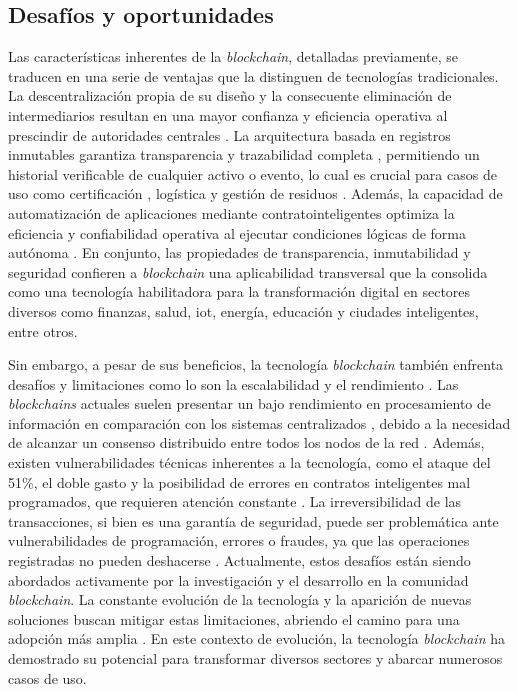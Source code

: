 \subsection{Desafíos y oportunidades}

Las características inherentes de la \textit{blockchain}, detalladas previamente, se traducen en una serie de ventajas que la distinguen de tecnologías tradicionales. La descentralización propia de su diseño y la consecuente eliminación de intermediarios resultan en una mayor confianza \cite{rejeb2023role} y eficiencia operativa al prescindir de autoridades centrales \cite{sharabati2024blockchain}. La arquitectura basada en registros inmutables garantiza transparencia y \gls{trazabilidad} completa \cite{sharabati2024blockchain}, permitiendo un historial verificable de cualquier activo o evento, lo cual es crucial para casos de uso como certificación \cite{bartolomeo2020introduccion}, logística \cite{bartolomeo2020introduccion, rejeb2023role} y gestión de residuos \cite{bulkowska2023implementation}. Además, la capacidad de automatización de aplicaciones mediante \glspl{contratointeligente} optimiza la eficiencia y confiabilidad operativa al ejecutar condiciones lógicas de forma autónoma \cite{bartolomeo2020introduccion}. En conjunto, las propiedades de transparencia, inmutabilidad y seguridad confieren a \textit{blockchain} una aplicabilidad transversal que la consolida como una tecnología habilitadora para la transformación digital en sectores diversos como finanzas, salud, \gls{iot}, energía, educación y ciudades inteligentes, entre otros.

Sin embargo, a pesar de sus beneficios, la tecnología \textit{blockchain} también enfrenta desafíos y limitaciones como lo son la escalabilidad y el rendimiento \cite{tripathi2023comprehensive}. Las \textit{blockchains} actuales suelen presentar un bajo rendimiento en procesamiento de información en comparación con los sistemas centralizados \cite{baralla2023waste}, debido a la necesidad de alcanzar un consenso distribuido entre todos los \glspl{nodo} de la red \cite{tripathi2023comprehensive}. Además, existen vulnerabilidades técnicas inherentes a la tecnología, como el ataque del 51\%, el doble gasto y la posibilidad de errores en contratos inteligentes mal programados, que requieren atención constante \cite{diez2023web}. La irreversibilidad de las transacciones, si bien es una garantía de seguridad, puede ser problemática ante vulnerabilidades de programación, errores o fraudes, ya que las operaciones registradas no pueden deshacerse \cite{taherdoost2023smart}. Actualmente, estos desafíos están siendo abordados activamente por la investigación y el desarrollo en la comunidad \textit{blockchain}. La constante evolución de la tecnología y la aparición de nuevas soluciones buscan mitigar estas limitaciones, abriendo el camino para una adopción más amplia \cite{tripathi2023comprehensive, baralla2023waste, taherdoost2023smart}. En este contexto de evolución, la tecnología \textit{blockchain} ha demostrado su potencial para transformar diversos sectores y abarcar numerosos casos de uso.

